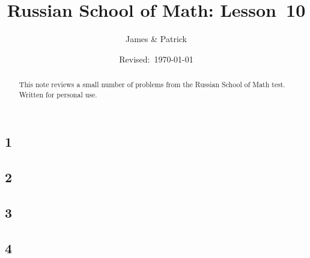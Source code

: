 \documentclass[12pt]{article}
\title{Russian School of Math: Lesson~10}
\author{James \& Patrick}
\date{Revised:~\today}
\begin{document}
\maketitle
\begin{abstract}\setlength{\parindent}{0pt}%
This note reviews a small number of problems from the Russian School of Math test. Written for personal use.
\end{abstract}

\thispagestyle{empty}
\clearpage

\subsection*{1}

\begin{solution}
  
\end{solution}

\subsection*{2}

\begin{solution}
  
\end{solution}

\subsection*{3}

\begin{solution}
  
\end{solution}

\subsection*{4}

\begin{solution}
  
\end{solution}
\end{document}

